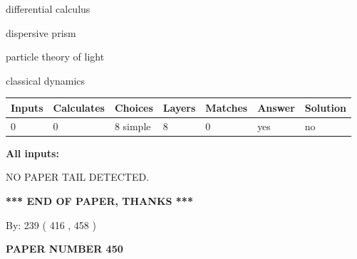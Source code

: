 \documentclass[12pt]{article}
\begin{document}
 
differential calculus
 
 
dispersive prism
 
 
particle theory of light
 
 
classical dynamics
 
 
\noindent{}
 
 
   
   
   
   
\noindent\begin{tabular}{|l|l|l|l|l|l|l|}
 \hline
Inputs & Calculates & Choices & Layers & Matches & Answer & Solution \\ \hline
 0  & 
 0  & 
 8
  simple  
  & 
 8  & 
 0  & 
  yes & 
  no 
  \\ \hline
 \end{tabular}
   
   
   
   
\noindent{}
   
   
   
   
\noindent\vspace{0.1in}\hspace{-0.08in} {\textbf{\Large{All inputs: }}}
   
   
   
   
\vspace{2.0in} NO PAPER TAIL DETECTED.
   
   
   
   
\vspace{1.0in} 
{\textbf{\large{ *** END OF PAPER, THANKS *** }}} 
   
   
\hspace{1.0in} By: 
 239 ( 416 ,  458 )
   
   
   
   
\newpage 
\setcounter{page}{ 
   450001 } 
   
   
   
   
 {\textbf{ \Large{ PAPER NUMBER  450  }}}
   
   
\vspace{0.2in}
   
   
   
\end{document}
